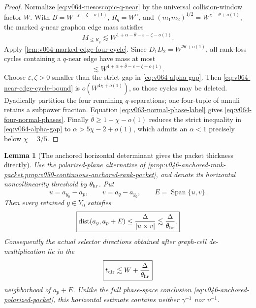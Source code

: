 \documentclass[10pt]{article}
\newtheorem{lemma}[theorem]{Lemma}
\begin{document}
\begin{proof}
Normalize \eqref{eq:v064-mesoscopic-q-near} by the universal collision-window factor \(W\).  With
\(B=W^{-\chi-\zeta-o(1)}\), \(R_q=W^\alpha\), and
\((m_1m_2)^{1/2}=W^{\chi-\bar\theta+o(1)}\), the marked \(q\)-near graphon edge mass satisfies
\[
M_{\le R_q}
\lesssim
W^{1+\alpha-\bar\theta-\varepsilon-\zeta-o(1)}.
\]
Apply \cref{lem:v064-marked-edge-four-cycle}.  Since
\(D_1D_2=W^{2\bar\theta+o(1)}\), all rank-loss cycles containing a \(q\)-near edge have mass at most
\begin{equation}
\label{eq:v064-near-edge-cycle-bound}
\boxed{
\lesssim
W^{1+\alpha+\bar\theta-\varepsilon-\zeta-o(1)}.
}
\end{equation}
Choose \(\varepsilon,\zeta>0\) smaller than the strict gap in
\eqref{eq:v064-alpha-gap}.  Then \eqref{eq:v064-near-edge-cycle-bound} is
\(o(W^{4\chi+o(1)})\), so those cycles may be deleted.  Dyadically partition the four remaining
\(q\)-separations; one four-tuple of annuli retains a subpower fraction.  Equation
\eqref{eq:v063-normal-phase-label} gives \eqref{eq:v064-four-normal-phases}.  Finally
\(\bar\theta\ge1-\chi-o(1)\) reduces the strict inequality in
\eqref{eq:v064-alpha-gap} to \(\alpha>5\chi-2+o(1)\), which admits an \(\alpha<1\) precisely below
\(\chi=3/5\).
\end{proof}

\begin{lemma}[The anchored horizontal determinant gives the packet thickness directly]
\label{lem:v066-direct-horizontal-packet-thickness}
Use the polarized-plane alternative of
\cref{prop:v046-anchored-rank-packet,prop:v050-continuous-anchored-rank-packet}, and denote its
horizontal noncollinearity threshold by \(\theta_{\rm hr}\).  Put
\[
u=a_{y_0}-a_p,\qquad
v=a_q-a_{y_0},\qquad
E=\operatorname{Span}\{u,v\}.
\]
Then every retained \(y\in Y_0\) satisfies
\begin{equation}
\label{eq:v066-direct-horizontal-packet-thickness}
\boxed{
\operatorname{dist}(a_y,a_p+E)
\le
\frac{\Delta}{|u\times v|}
\lesssim
\frac{\Delta}{\theta_{\rm hr}}.
}
\end{equation}
Consequently the actual selector directions obtained after graph-cell de-multiplication lie in the
\begin{equation}
\label{eq:v066-actual-horizontal-packet-thickness}
\boxed{
t_{\rm dir}
\lesssim
W+\frac{\Delta}{\theta_{\rm hr}}
}
\end{equation}
neighborhood of \(a_p+E\).  Unlike the full phase-space conclusion
\eqref{eq:v046-anchored-polarized-packet}, this horizontal estimate contains neither
\(\gamma^{-1}\) nor \(\upsilon^{-1}\).
\end{lemma}
\end{document}
